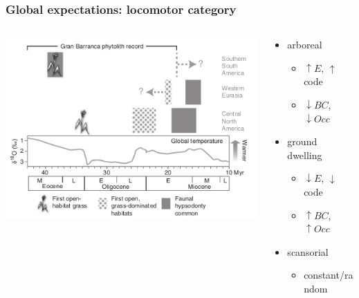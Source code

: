 \documentclass{beamer}
\begin{document}
\begin{frame}
  \frametitle{Global expectations: locomotor category}

  \begin{columns}
    \begin{column}{0.6\textwidth}
      \includegraphics[height=0.8\textheight,width=\textwidth,keepaspectratio=true]{figure/stromberg}

      \tiny{}
    \end{column}
    \begin{column}{0.4\textwidth}
      \begin{itemize}
        \item arboreal
          \begin{itemize}
            \item \(\uparrow E\), \(\uparrow\) code
            \item \(\downarrow BC\), \(\downarrow Occ\)
          \end{itemize}
        \item ground dwelling
          \begin{itemize}
            \item \(\downarrow E\), \(\downarrow\) code
            \item \(\uparrow BC\), \(\uparrow Occ\)
          \end{itemize}
        \item scansorial
          \begin{itemize}
            \item constant/random
          \end{itemize}
      \end{itemize}
    \end{column}
  \end{columns}
\end{frame}
\end{document}
